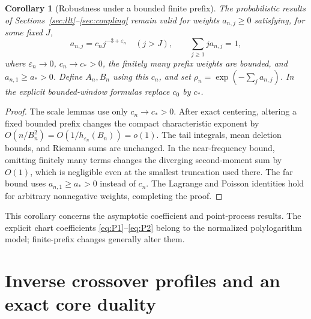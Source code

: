 \documentclass[11pt,a4paper]{article}
\numberwithin{equation}{section}
\newtheorem{corollary}[theorem]{Corollary}
\theoremstyle{definition}
\theoremstyle{remark}
\newcommand{\eps}{\varepsilon}
\begin{document}
\begin{corollary}[Robustness under a bounded finite prefix]
\label{cor:prefix}
The probabilistic results of Sections~\ref{sec:llt}--\ref{sec:coupling} remain
valid for weights \(a_{n,j}\ge0\) satisfying, for some fixed \(J\),
\begin{equation}
 a_{n,j}=c_nj^{-3+\eps_n}\quad(j>J),\qquad
 \sum_{j\ge1}j a_{n,j}=1,
 \label{eq:prefix-model}
\end{equation}
where \(\eps_n\to0\), \(c_n\to c_*>0\), the finitely many prefix weights
are bounded, and \(a_{n,1}\ge a_*>0\). Define \(A_n,B_n\) using this \(c_n\),
and set \(\rho_n=\exp(-\sum_j a_{n,j})\). In the explicit bounded-window
formulas replace \(c_0\) by \(c_*\).
\end{corollary}
\begin{proof}
The scale lemmas use only \(c_n\to c_*>0\). After exact centering, altering a
fixed bounded prefix changes the compact characteristic exponent by
\(O(n/B_n^2)=O(1/h_{\eps_n}(B_n))=o(1)\). The tail integrals, mean deletion
bounds, and Riemann sums are unchanged. In the near-frequency bound, omitting
finitely many terms changes the diverging second-moment sum by \(O(1)\),
which is negligible even at the smallest truncation used there. The far
bound uses \(a_{n,1}\ge a_*>0\) instead of \(c_n\). The Lagrange and Poisson
identities hold for arbitrary nonnegative weights, completing the proof.
\end{proof}

This corollary concerns the asymptotic coefficient and point-process results.
The explicit chart coefficients \eqref{eq:P1}--\eqref{eq:P2} belong to the
normalized polylogarithm model; finite-prefix changes generally alter them.

\section{Inverse crossover profiles and an exact core duality}
\label{sec:duality}
\end{document}
